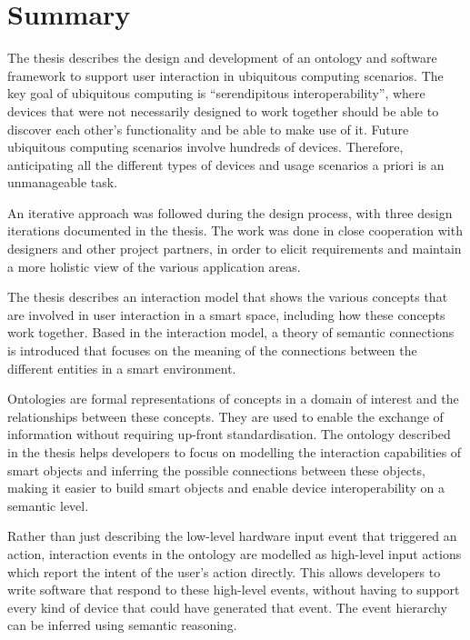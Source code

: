 \cleardoublepage
\begingroup
\let\clearpage\relax
\let\cleardoublepage\relax
\let\cleardoublepage\relax

\chapter*{Summary}
The thesis describes the design and development of an ontology and software framework to support user interaction in ubiquitous computing scenarios. The key goal of ubiquitous computing is ``serendipitous interoperability'', where devices that were not necessarily designed to work together should be able to discover each other's functionality and be able to make use of it. Future ubiquitous computing scenarios involve hundreds of devices. Therefore, anticipating all the different types of devices and usage scenarios a priori is an unmanageable task.

An iterative approach was followed during the design process, with three design iterations documented in the thesis. The work was done in close cooperation with designers and other project partners, in order to elicit requirements and maintain a more holistic view of the various application areas.
 
The thesis describes an interaction model that shows the various concepts that are involved in user interaction in a smart space, including how these concepts work together. Based in the interaction model, a theory of semantic connections is introduced that focuses on the meaning of the connections between the different entities in a smart environment.

Ontologies are formal representations of concepts in a domain of interest and the relationships between these concepts. They are used to enable the exchange of information without requiring up-front standardisation. The ontology described in the thesis helps developers to focus on modelling the interaction capabilities of smart objects and inferring the possible connections between these objects, making it easier to build smart objects and enable device interoperability on a semantic level.

Rather than just describing the low-level hardware input event that triggered an action, interaction events in the ontology are modelled as high-level input actions which report the intent of the user's action directly. This allows developers to write software that respond to these high-level events, without having to support every kind of device that could have generated that event. The event hierarchy can be inferred using semantic reasoning.

